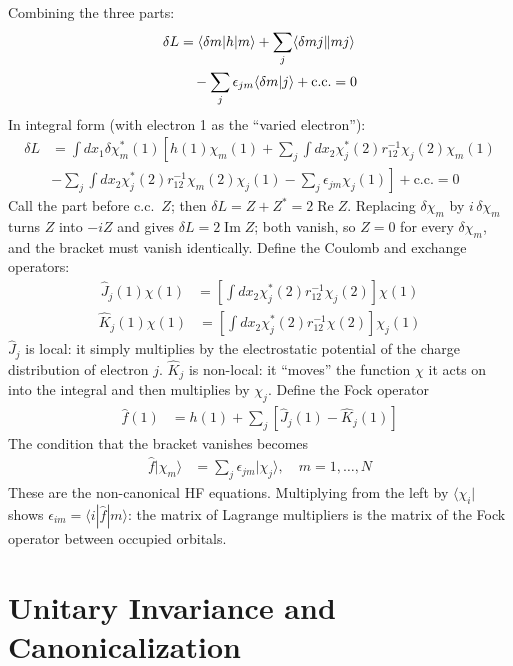 Combining the three parts:
\begin{align*}
\delta L &= \langle \delta m|h|m\rangle + \sum_j \langle \delta m j\Vert m j\rangle \\
&\quad - \sum_j \epsilon_{jm} \langle \delta m|j\rangle + \text{c.c.} = 0
\end{align*}
In integral form (with electron 1 as the ``varied electron''):
\begin{align*}
\delta L &= \int dx_1 \delta \chi_m^*(1) \left[ h(1) \chi_m(1) + \sum_j \int dx_2 \chi_j^*(2) r_{12}^{-1} \chi_j(2) \chi_m(1) \right. \\
& \left. - \sum_j \int dx_2 \chi_j^*(2) r_{12}^{-1} \chi_m(2) \chi_j(1) - \sum_j \epsilon_{jm} \chi_j(1) \right] + \text{c.c.} = 0
\end{align*}
Call the part before c.c.\ $Z$; then $\delta L = Z + Z^* = 2 \operatorname{Re} Z$. Replacing $\delta \chi_m$ by $i\, \delta\chi_m$ turns $Z$ into $-iZ$ and gives $\delta L = 2 \operatorname{Im} Z$; both vanish, so $Z = 0$ for every $\delta \chi_m$, and the bracket must vanish identically. Define the Coulomb and exchange operators:
\begin{align*}
\hat{J}_j(1) \chi(1) &= \left[ \int dx_2 \chi_j^*(2) r_{12}^{-1} \chi_j(2) \right] \chi(1)
\end{align*}
\begin{align*}
\hat{K}_j(1) \chi(1) &= \left[ \int dx_2 \chi_j^*(2) r_{12}^{-1} \chi(2) \right] \chi_j(1)
\end{align*}
$\hat{J}_j$ is local: it simply multiplies by the electrostatic potential of the charge distribution of electron $j$. $\hat{K}_j$ is non-local: it ``moves'' the function $\chi$ it acts on into the integral and then multiplies by $\chi_j$. Define the Fock operator
\begin{align}\label{eq:fock-op}
\hat{f}(1) &= h(1) + \sum_j [\hat{J}_j(1) - \hat{K}_j(1)]
\end{align}
The condition that the bracket vanishes becomes
\begin{align}\label{eq:hf-noncanonical}
\hat{f} |\chi_m\rangle &= \sum_j \epsilon_{jm} |\chi_j\rangle, \quad m = 1, \dots, N
\end{align}
These are the non-canonical HF equations. Multiplying from the left by $\langle \chi_i|$ shows $\epsilon_{im} = \langle i|\hat{f}|m\rangle$: the matrix of Lagrange multipliers is the matrix of the Fock operator between occupied orbitals.

\section{Unitary Invariance and Canonicalization}

